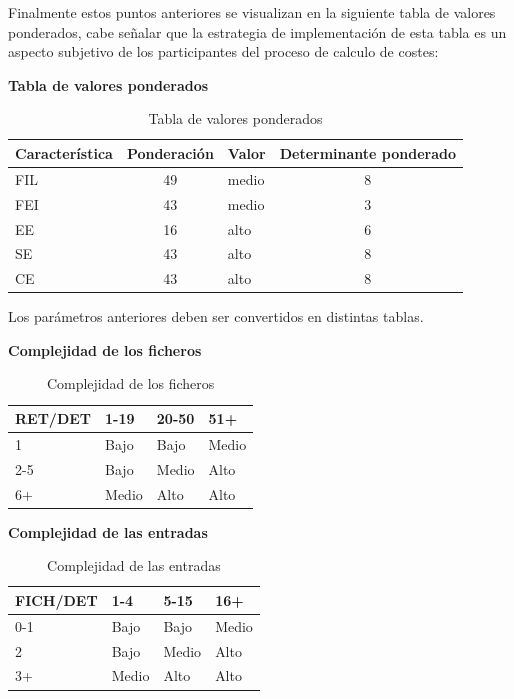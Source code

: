 \documentclass[a4paper,12pt,openany,oneside]{book}
\begin{document}
Finalmente estos puntos anteriores se visualizan en la siguiente tabla de valores ponderados, cabe señalar que la estrategia de implementación de esta tabla es un aspecto subjetivo de los participantes del proceso de calculo de costes:

\begin{table}[!ht]
\centering
\textbf{Tabla de valores ponderados}\\
\begin{tabular}{| l | c | l | c |}
\hline

    \rowcolor{green!50}
\textbf{Característica} & \textbf{Ponderación} & \textbf{Valor} & \textbf{Determinante ponderado} \\
\hline
FIL & 49 & medio & 8\\
\hline
FEI & 43 & medio & 3\\
\hline
EE & 16  & alto  & 6\\
\hline
SE & 43  & alto  & 8\\
\hline
CE & 43  & alto  & 8\\
\hline
\end{tabular}
\caption{Tabla de valores ponderados}
\end{table}

Los parámetros anteriores deben ser convertidos en distintas tablas.

\begin{table}[!ht]
\centering
\textbf{Complejidad de los ficheros}\\
\begin{tabular}{| l | l | l | l |}
\hline

    \rowcolor{green!50}
\textbf{RET/DET} & \textbf{1-19} & \textbf{20-50} & \textbf{51+} \\
\hline
1 & Bajo & Bajo & Medio\\
\hline
2-5 & Bajo & Medio & Alto\\
\hline
6+ & Medio & Alto & Alto\\
\hline
\end{tabular}
\caption{Complejidad de los ficheros}
\end{table}

\begin{table}[!ht]
\centering
\textbf{Complejidad de las entradas}\\
\begin{tabular}{| l | l | l | l |}
\hline
\rowcolor{green!50}
\textbf{FICH/DET} & \textbf{1-4} & \textbf{5-15} & \textbf{16+} \\
\hline
0-1 & Bajo & Bajo & Medio\\
\hline
2 & Bajo & Medio & Alto\\
\hline
3+ & Medio & Alto & Alto\\
\hline
\end{tabular}
\caption{Complejidad de las entradas}
\end{table}
\end{document}
